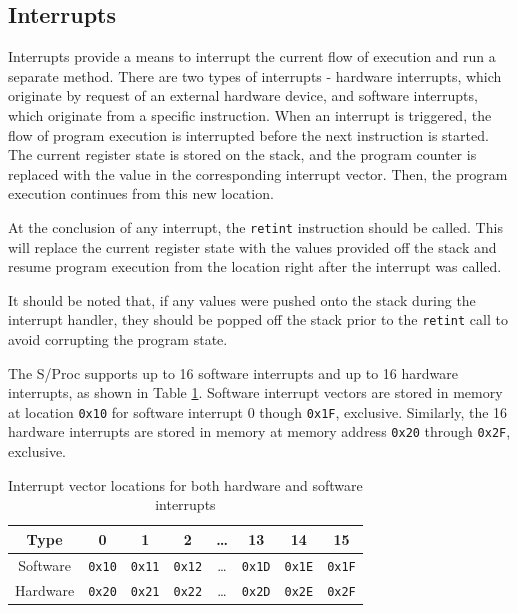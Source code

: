 \documentclass{article}
\begin{document}
\subsection{Interrupts}

Interrupts provide a means to interrupt the current flow of execution and run a separate method. There are two types of interrupts - hardware interrupts, which originate by request of an external hardware device, and software interrupts, which originate from a specific instruction. When an interrupt is triggered, the flow of program execution is interrupted before the next instruction is started. The current register state is stored on the stack, and the program counter is replaced with the value in the corresponding interrupt vector. Then, the program execution continues from this new location.

At the conclusion of any interrupt, the \texttt{retint} instruction should be called. This will replace the current register state with the values provided off the stack and resume program execution from the location right after the interrupt was called.

It should be noted that, if any values were pushed onto the stack during the interrupt handler, they should be popped off the stack prior to the \texttt{retint} call to avoid corrupting the program state.

The S/Proc supports up to 16 software interrupts and up to 16 hardware interrupts, as shown in Table \ref{table:interrupt-vector-locations}. Software interrupt vectors are stored in memory at location \texttt{0x10} for software interrupt 0 though \texttt{0x1F}, exclusive. Similarly, the 16 hardware interrupts are stored in memory at memory address \texttt{0x20} through \texttt{0x2F}, exclusive.

\begin{table}[h!]
    \centering
    \begin{tabular}{c|ccccccc}
        \hline
        Type & 0 & 1 & 2 & \dots & 13 & 14 & 15 \\
        \hline
        Software & \texttt{0x10} & \texttt{0x11} & \texttt{0x12} & \dots & \texttt{0x1D} & \texttt{0x1E} & \texttt{0x1F} \\
        Hardware & \texttt{0x20} & \texttt{0x21} & \texttt{0x22} & \dots & \texttt{0x2D} & \texttt{0x2E} & \texttt{0x2F} \\
        \hline
    \end{tabular}
    \caption{Interrupt vector locations for both hardware and software interrupts}
    \label{table:interrupt-vector-locations}
\end{table}
\end{document}
